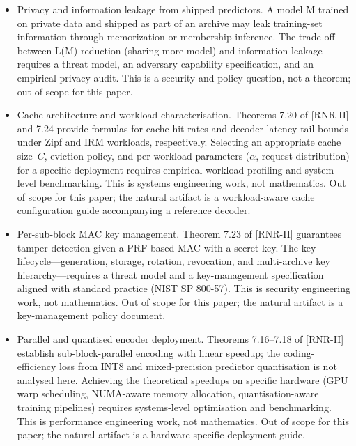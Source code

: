 \documentclass[
]{article}
\begin{document}
\begin{itemize}
  connects Theorem 5.5\textquotesingle s separation to the manifold
  hypothesis. Computing or estimating the intrinsic dimension d of
  specific natural-data classes (database pages of a given schema,
  telemetry under a given protocol, image data of a given modality)
  requires applied data analysis using established estimators
  (Levina-Bickel maximum likelihood, correlation dimension, persistent
  homology). This is empirical work, not mathematics. Out of scope for
  this paper.
\item
  Privacy and information leakage from shipped predictors. A model M
  trained on private data and shipped as part of an archive may leak
  training-set information through memorization or membership inference.
  The trade-off between L(M) reduction (sharing more model) and
  information leakage requires a threat model, an adversary capability
  specification, and an empirical privacy audit. This is a security and
  policy question, not a theorem; out of scope for this paper.
\item
  Cache architecture and workload characterisation. Theorems 7.20 of [RNR-II] and
  7.24 provide formulas for cache hit rates and decoder-latency tail
  bounds under Zipf and IRM workloads, respectively. Selecting an
  appropriate cache size~$C$, eviction policy, and per-workload
  parameters ($\alpha$, request distribution) for a specific deployment
  requires empirical workload profiling and system-level benchmarking.
  This is systems engineering work, not mathematics. Out of scope for
  this paper; the natural artifact is a workload-aware cache
  configuration guide accompanying a reference decoder.
\item
  Per-sub-block MAC key management. Theorem 7.23 of [RNR-II] guarantees tamper
  detection given a PRF-based MAC with a secret key. The key
  lifecycle---generation, storage, rotation, revocation, and
  multi-archive key hierarchy---requires a threat model and a
  key-management specification aligned with standard practice
  (NIST SP 800-57). This is security engineering work, not mathematics.
  Out of scope for this paper; the natural artifact is a key-management
  policy document.
\item
  Parallel and quantised encoder deployment. Theorems 7.16--7.18 of [RNR-II]
  establish sub-block-parallel encoding with linear speedup; the
  coding-efficiency loss from INT8 and mixed-precision predictor
  quantisation is not analysed here. Achieving the theoretical speedups on
  specific hardware (GPU warp scheduling, NUMA-aware memory allocation,
  quantisation-aware training pipelines) requires systems-level
  optimisation and benchmarking. This is performance engineering work,
  not mathematics. Out of scope for this paper; the natural artifact is
  a hardware-specific deployment guide.
\end{itemize}
\end{document}
